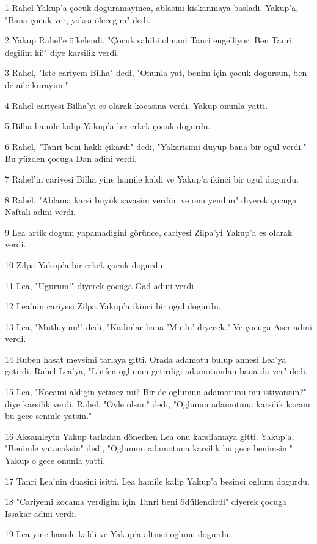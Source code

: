 \par 1 Rahel Yakup'a çocuk doguramayinca, ablasini kiskanmaya basladi. Yakup'a, "Bana çocuk ver, yoksa ölecegim" dedi.
\par 2 Yakup Rahel'e öfkelendi. "Çocuk sahibi olmani Tanri engelliyor. Ben Tanri degilim ki!" diye karsilik verdi.
\par 3 Rahel, "Iste cariyem Bilha" dedi, "Onunla yat, benim için çocuk dogursun, ben de aile kurayim."
\par 4 Rahel cariyesi Bilha'yi es olarak kocasina verdi. Yakup onunla yatti.
\par 5 Bilha hamile kalip Yakup'a bir erkek çocuk dogurdu.
\par 6 Rahel, "Tanri beni hakli çikardi" dedi, "Yakarisimi duyup bana bir ogul verdi." Bu yüzden çocuga Dan adini verdi.
\par 7 Rahel'in cariyesi Bilha yine hamile kaldi ve Yakup'a ikinci bir ogul dogurdu.
\par 8 Rahel, "Ablama karsi büyük savasim verdim ve onu yendim" diyerek çocuga Naftali adini verdi.
\par 9 Lea artik dogum yapamadigini görünce, cariyesi Zilpa'yi Yakup'a es olarak verdi.
\par 10 Zilpa Yakup'a bir erkek çocuk dogurdu.
\par 11 Lea, "Ugurum!" diyerek çocuga Gad adini verdi.
\par 12 Lea'nin cariyesi Zilpa Yakup'a ikinci bir ogul dogurdu.
\par 13 Lea, "Mutluyum!" dedi, "Kadinlar bana 'Mutlu' diyecek." Ve çocuga Aser adini verdi.
\par 14 Ruben hasat mevsimi tarlaya gitti. Orada adamotu bulup annesi Lea'ya getirdi. Rahel Lea'ya, "Lütfen oglunun getirdigi adamotundan bana da ver" dedi.
\par 15 Lea, "Kocami aldigin yetmez mi? Bir de oglumun adamotunu mu istiyorsun?" diye karsilik verdi. Rahel, "Öyle olsun" dedi, "Oglunun adamotuna karsilik kocam bu gece seninle yatsin."
\par 16 Aksamleyin Yakup tarladan dönerken Lea onu karsilamaya gitti. Yakup'a, "Benimle yatacaksin" dedi, "Oglumun adamotuna karsilik bu gece benimsin." Yakup o gece onunla yatti.
\par 17 Tanri Lea'nin duasini isitti. Lea hamile kalip Yakup'a besinci oglunu dogurdu.
\par 18 "Cariyemi kocama verdigim için Tanri beni ödüllendirdi" diyerek çocuga Issakar adini verdi.
\par 19 Lea yine hamile kaldi ve Yakup'a altinci oglunu dogurdu.
